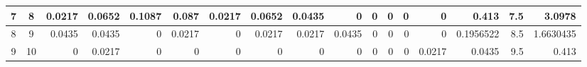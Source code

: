 \begin{table}[ht]
\begin{adjustbox}{width = \textwidth, center}
\begin{tabular}{|cc|r|r|r|r|r|r|r|r|r|r|r|r|r|r|r|}
            \cellcolor[HTML]{C9DAF8}7              & \cellcolor[HTML]{EBF1FC}8              & \cellcolor[HTML]{DEF2E8}0.0217                 & \cellcolor[HTML]{9BD7B9}0.0652                 & \cellcolor[HTML]{57BB8A}0.1087                 & \cellcolor[HTML]{79C9A2}0.087                  & \cellcolor[HTML]{DEF2E8}0.0217                 & \cellcolor[HTML]{9BD7B9}0.0652                 & \cellcolor[HTML]{BCE4D1}0.0435                 & \cellcolor[HTML]{FFFFFF}0                       & \cellcolor[HTML]{FFFFFF}0                       & \cellcolor[HTML]{FFFFFF}0                       & \cellcolor[HTML]{FFFFFF}0                       & \cellcolor[HTML]{FFFFFF}0                       & \cellcolor[HTML]{D9D2E9}0.413                                                   & \cellcolor[HTML]{D9D2E9}7.5                                             & \cellcolor[HTML]{D9D2E9}3.0978                                                        \\ \hline
            \cellcolor[HTML]{C9DAF8}8              & \cellcolor[HTML]{EBF1FC}9              & \cellcolor[HTML]{BCE4D1}0.0435                 & \cellcolor[HTML]{BCE4D1}0.0435                 & \cellcolor[HTML]{FFFFFF}0                      & \cellcolor[HTML]{DEF2E8}0.0217                 & \cellcolor[HTML]{FFFFFF}0                      & \cellcolor[HTML]{DEF2E8}0.0217                 & \cellcolor[HTML]{DEF2E8}0.0217                 & \cellcolor[HTML]{BCE4D1}0.0435                  & \cellcolor[HTML]{FFFFFF}0                       & \cellcolor[HTML]{FFFFFF}0                       & \cellcolor[HTML]{FFFFFF}0                       & \cellcolor[HTML]{FFFFFF}0                       & \cellcolor[HTML]{D9D2E9}0.1956522                                               & \cellcolor[HTML]{D9D2E9}8.5                                             & \cellcolor[HTML]{D9D2E9}1.6630435                                                     \\ \hline
            \rowcolor[HTML]{FFFFFF} 
            \cellcolor[HTML]{C9DAF8}9              & \cellcolor[HTML]{EBF1FC}10             & 0                                              & \cellcolor[HTML]{DEF2E8}0.0217                 & 0                                              & 0                                              & 0                                              & 0                                              & 0                                              & 0                                               & 0                                               & 0                                               & 0                                               & \cellcolor[HTML]{DEF2E8}0.0217                  & \cellcolor[HTML]{D9D2E9}0.0435                                                  & \cellcolor[HTML]{D9D2E9}9.5                                             & \cellcolor[HTML]{D9D2E9}0.413                                                         \\ \hline

\end{tabular}
\end{adjustbox}
\end{table}
